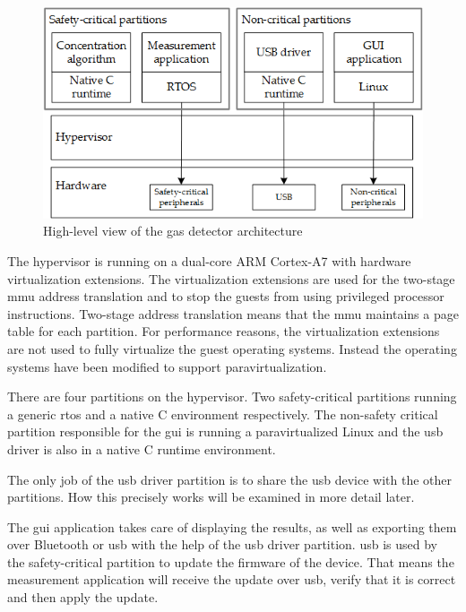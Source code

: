 \begin{figure}[ht!]
\centering
\includegraphics[scale=0.75]{Figures/gas_detect_high_level_no_ipc_with_criticality.png}
\decoRule
\caption{High-level view of the gas detector architecture}
\label{fig:gas_detect_high_level}
\end{figure}

\newcommand{\bToa}{3}
\newcommand{\bToc}{1}
\newcommand{\cTob}{2}
\newcommand{\usbToa}{4}
\newcommand{\aTousb}{4}
\newcommand{\usbTob}{5}
\newcommand{\bTousb}{5}

The hypervisor is running on a dual-core ARM Cortex-A7 with hardware virtualization extensions. The virtualization extensions are used for the two-stage \acrshort{mmu} address translation and to stop the guests from using privileged processor instructions. Two-stage address translation means that the \acrshort{mmu} maintains a page table for each partition. 
For performance reasons, the virtualization extensions are not used to fully virtualize the guest operating systems. Instead the operating systems have been modified to support paravirtualization.

There are four partitions on the hypervisor. Two safety-critical partitions running a generic \acrshort{rtos} and a native C environment respectively. The non-safety critical partition responsible for the \acrshort{gui} is running a paravirtualized Linux and the \acrshort{usb} driver is also in a native C runtime environment. 

The only job of the \acrshort{usb} driver partition is to share the \acrshort{usb} device with the other partitions. How this precisely works will be examined in more detail later.

The \acrshort{gui} application takes care of displaying the results, as well as exporting them over Bluetooth or \acrshort{usb} with the help of the \acrshort{usb} driver partition. \acrshort{usb} is used by the safety-critical partition to update the firmware of the device. That means the measurement application will receive the update over \acrshort{usb}, verify that it is correct and then apply the update.

